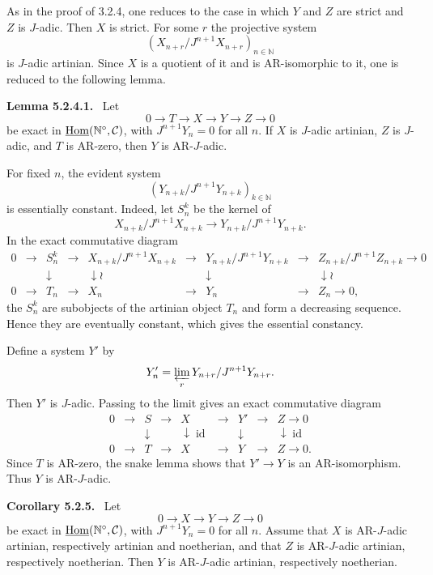 \documentclass[11pt]{article}
\theoremstyle{plain}
\theoremstyle{definition}
\theoremstyle{remark}
\newenvironment{statement}[1]{\par\medskip\noindent\textbf{#1.}\ }{\par\medskip}
\newcommand{\bN}{\mathbb N}
\DeclareMathOperator{\Hom}{Hom}
\DeclareMathOperator{\id}{id}
\begin{document}
As in the proof of 3.2.4, one reduces to the case in which $Y$ and $Z$ are strict
and $Z$ is $J$-adic. Then $X$ is strict. For some $r$ the projective system
\[
      (X_{n+r}/J^{n+1}X_{n+r})_{n\in\bN}
\]
is $J$-adic artinian. Since $X$ is a quotient of it and is AR-isomorphic to it, one
is reduced to the following lemma.

\begin{statement}{Lemma 5.2.4.1}
Let
\[
       0\to T\to X\to Y\to Z\to0
\]
be exact in $\underline{\Hom}(\bN^\circ,\cC)$, with $J^{n+1}Y_n=0$ for all $n$.
If $X$ is $J$-adic artinian, $Z$ is $J$-adic, and $T$ is AR-zero, then $Y$ is
AR-$J$-adic.
\end{statement}

For fixed $n$, the evident system
\[
       (Y_{n+k}/J^{n+1}Y_{n+k})_{k\in\bN}
\]
is essentially constant. Indeed, let $S_n^k$ be the kernel of
\[
       X_{n+k}/J^{n+1}X_{n+k}\longrightarrow
       Y_{n+k}/J^{n+1}Y_{n+k}.
\]
In the exact commutative diagram
\[
\begin{array}{ccccccccc}
0&\to&S_n^k&\to&X_{n+k}/J^{n+1}X_{n+k}&\to&Y_{n+k}/J^{n+1}Y_{n+k}&\to&Z_{n+k}/J^{n+1}Z_{n+k}\to0\\
 &&\downarrow&&\downarrow\wr&&\downarrow&&\downarrow\wr\\
0&\to&T_n&\to&X_n&\to&Y_n&\to&Z_n\to0,
\end{array}
\]
the $S_n^k$ are subobjects of the artinian object $T_n$ and form a decreasing
sequence. Hence they are eventually constant, which gives the essential constancy.

Define a system $Y'$ by
\[
       Y'_n=\varprojlim_r Y_{n+r}/J^{n+1}Y_{n+r}.
\]
Then $Y'$ is $J$-adic. Passing to the limit gives an exact commutative diagram
\[
\begin{array}{ccccccccc}
0&\to&S&\to&X&\to&Y'&\to&Z\to0\\
 &&\downarrow&&\downarrow\id&&\downarrow&&\downarrow\id\\
0&\to&T&\to&X&\to&Y&\to&Z\to0.
\end{array}
\]
Since $T$ is AR-zero, the snake lemma shows that $Y'\to Y$ is an AR-isomorphism.
Thus $Y$ is AR-$J$-adic.

\begin{statement}{Corollary 5.2.5}
Let
\[
       0\to X\to Y\to Z\to0
\]
be exact in $\underline{\Hom}(\bN^\circ,\cC)$, with $J^{n+1}Y_n=0$ for all $n$.
Assume that $X$ is AR-$J$-adic artinian, respectively artinian and noetherian, and
that $Z$ is AR-$J$-adic artinian, respectively noetherian. Then $Y$ is
AR-$J$-adic artinian, respectively noetherian.
\end{statement}
\end{document}
